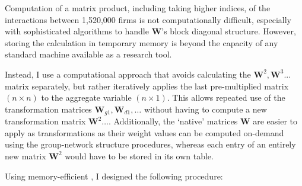 Computation of a matrix product, including taking higher indices,
of the interactions between 1,520,000 firms is not computationally difficult,
especially with sophisticated algorithms to handle $\mathbf W$'s block diagonal structure.
However, storing the calculation in temporary memory is beyond
the capacity of any standard machine available as a research tool.
\par
Instead, I use a computational approach that avoids calculating the $\mathbf W^2, \mathbf W^3...$ matrix separately,
but rather iteratively applies the last pre-multiplied matrix $(n\times n)$ to the aggregate variable $(n\times 1)$.
This allows repeated use of the transformation matrices $\mathbf W_{g1}, \mathbf W_{d1}, \dots$
without having to compute a new transformation matrix $\mathbf W^2\dots$.
Additionally, the `native' matrices $\mathbf W$ are easier to apply as transformations
as their weight values can be computed on-demand using the group-network structure procedures,
whereas each entry of an entirely new matrix $\mathbf W^2$ would have to be stored in its own table.
\par
Using memory-efficient , I designed the following procedure:
